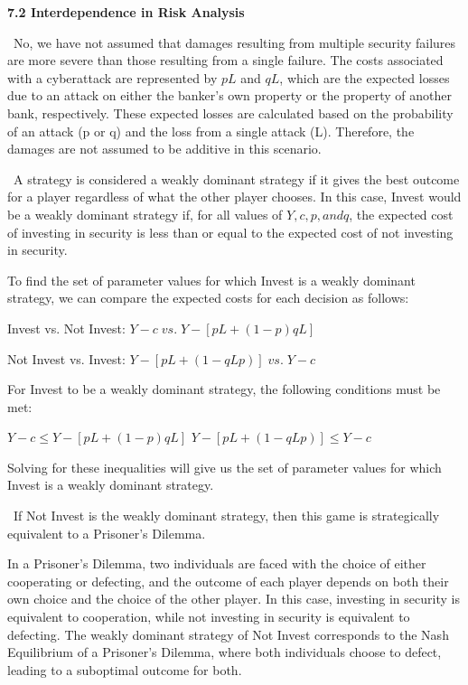 \documentclass{homework}
\begin{document}
\clearpage
\centerline{\Large\textbf{7.2 Interdependence in Risk Analysis}}
\Definition[1]\ 
No, we have not assumed that damages resulting from multiple security failures are more severe than those resulting from a single failure. The costs associated with a cyberattack are represented by $pL$ and $qL$, which are the expected losses due to an attack on either the banker's own property or the property of another bank, respectively. These expected losses are calculated based on the probability of an attack (p or q) and the loss from a single attack (L). Therefore, the damages are not assumed to be additive in this scenario.

\Definition[2]\ 
A strategy is considered a weakly dominant strategy if it gives the best outcome for a player regardless of what the other player chooses. In this case, Invest would be a weakly dominant strategy if, for all values of $Y, c, p, and q$, the expected cost of investing in security is less than or equal to the expected cost of not investing in security.

To find the set of parameter values for which Invest is a weakly dominant strategy, we can compare the expected costs for each decision as follows:

Invest vs. Not Invest:
$Y - c \; vs. \; Y - [pL + (1 - p)qL]$

Not Invest vs. Invest:
$Y - [pL + (1 - qLp)] \; vs. \; Y - c$

For Invest to be a weakly dominant strategy, the following conditions must be met:

$Y - c \leq Y - [pL + (1 - p)qL]$
$Y - [pL + (1 - qLp)] \leq Y - c$

Solving for these inequalities will give us the set of parameter values for which Invest is a weakly dominant strategy.

\Definition[3]\ 
If Not Invest is the weakly dominant strategy, then this game is strategically equivalent to a Prisoner's Dilemma.

In a Prisoner's Dilemma, two individuals are faced with the choice of either cooperating or defecting, and the outcome of each player depends on both their own choice and the choice of the other player. In this case, investing in security is equivalent to cooperation, while not investing in security is equivalent to defecting. The weakly dominant strategy of Not Invest corresponds to the Nash Equilibrium of a Prisoner's Dilemma, where both individuals choose to defect, leading to a suboptimal outcome for both.
\end{document}

